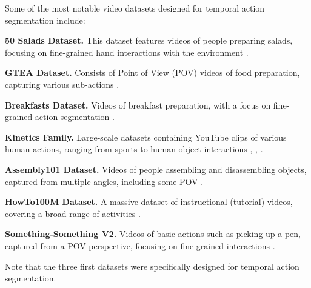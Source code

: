 Some of the most notable video datasets designed for temporal action segmentation include:

\noindent\textbf{50 Salads Dataset.} This dataset features videos of people preparing salads, focusing on fine-grained hand interactions with the environment \cite{50salads-dataset}.

\noindent\textbf{GTEA Dataset.} Consists of Point of View (POV) videos of food preparation, capturing various sub-actions \cite{gtea-dataset}.

\noindent\textbf{Breakfasts Dataset.} Videos of breakfast preparation, with a focus on fine-grained action segmentation \cite{breakfast-dataset}.

\noindent\textbf{Kinetics Family.} Large-scale datasets containing YouTube clips of various human actions, ranging from sports to human-object interactions \cite{kinetics-400-dataset}, \cite{kinetics-600-dataset}, \cite{kinetics-700-dataset}.

\noindent\textbf{Assembly101 Dataset.} Videos of people assembling and disassembling objects, captured from multiple angles, including some POV \cite{assembly101-dataset}.

\noindent\textbf{HowTo100M Dataset.} A massive dataset of instructional (tutorial) videos, covering a broad range of activities \cite{howto100m-dataset}.

\noindent\textbf{Something-Something V2.} Videos of basic actions such as picking up a pen, captured from a POV perspective, focusing on fine-grained interactions \cite{something-something-dataset}.

Note that the three first datasets were specifically designed for temporal action segmentation.

